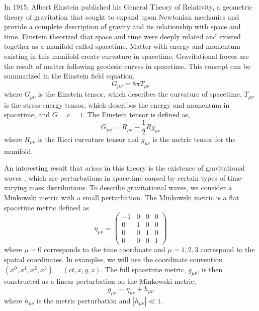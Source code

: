 In 1915, Albert Einstein published his General Theory of Relativity, a 
geometric theory of gravitation that sought to expand upon Newtonian 
mechanics and provide a complete description of gravity and its 
relationship with space and time. Einstein theorized that space 
and time were deeply related and existed together as a manifold 
called spacetime. Matter with energy and momentum 
existing in this manifold create 
curvature in spacetime. Gravitational forces are the result of 
matter following geodesic curves in spacetime. This concept can 
be summarized in the Einstein field equation, 
\begin{equation}
G_{\mu\nu} = 8\pi T_{\mu\nu}
\label{eq:EFE}
\end{equation}
where $G_{\mu\nu}$ is the Einstein tensor, which describes the 
curvature of spacetime, $T_{\mu\nu}$ is the 
stress-energy tensor, which describes the energy and momentum in 
spacetime, and  $G=c=1$. The Einstein tensor is defined as,
\begin{equation}
G_{\mu\nu} = R_{\mu\nu} - \frac{1}{2}Rg_{\mu\nu}
\end{equation}
where $R_{\mu\nu}$ is the Ricci curvature tensor and $g_{\mu\nu}$ is 
the metric tensor for the manifold.

An interesting result that arises in this theory  is the 
existence of gravitational waves \cite{Einstein:1916,Einstein:1918}, 
which are perturbations in 
spacetime caused by certain types of time-varying mass distributions. 
To describe gravitational waves, we consider 
a Minkowski metric with a small perturbation. The Minkowski metric 
is a flat spacetime metric defined as
\begin{equation}
\eta_{\mu\nu} = 
  \begin{pmatrix}
   -1 & 0 & 0 & 0 \\
    0 & 1 & 0 & 0 \\
    0 & 0 & 1 & 0 \\
    0 & 0 & 0 & 1
  \end{pmatrix}
\end{equation}
where $\mu = 0$ corresponds to the time coordinate and $\mu = {1,2,3}$ 
correspond to the spatial coordinates. In examples, we will use the coordinate 
convention $(x^0,x^1,x^2,x^3) = (ct,x,y,z)$. 
The full spacetime metric, $g_{\mu\nu}$, is then constructed as a 
linear perturbation on the Minkowski metric,
\begin{equation}
g_{\mu\nu} = \eta_{\mu\nu} + h_{\mu\nu}
\end{equation}
where $h_{\mu\nu}$ is the metric perturbation and $|h_{\mu\nu}| \ll 1$.

